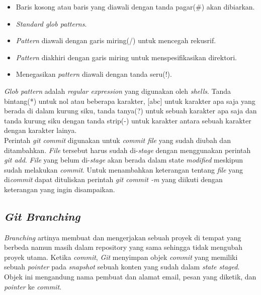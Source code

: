 \begin{itemize}
	\item Baris kosong atau baris yang diawali dengan tanda pagar(\#) akan dibiarkan.
	\item \textit{Standard glob patterns}.
	\item \textit{Pattern} diawali dengan garis miring(/) untuk mencegah rekusrif.
	\item \textit{Pattern} diakhiri dengan garis miring untuk menspesifikasikan direktori.
	\item Menegasikan \textit{pattern} diawali dengan tanda seru(!).
\end{itemize}

\textit{Glob pattern} adalah \textit{regular expression} yang digunakan oleh \textit{shells}. Tanda bintang(*) untuk nol atau beberapa karakter, [abc] untuk karakter apa saja yang berada di dalam kurung siku, tanda tanya(?) untuk sebuah karakter apa saja dan tanda kurung siku dengan tanda strip(-) untuk karakter antara sebuah karakter dengan karakter lainya.\\

Perintah \textit{git commit} digunakan untuk \textit{commit file} yang sudah diubah dan ditambahkan. \textit{File} tersebut harus sudah di-\textit{stage} dengan menggunakan perintah \textit{git add}. \textit{File} yang belum di-\textit{stage} akan berada dalam state \textit{modified} meskipun sudah melakukan \textit{commit}. Untuk menambahkan keterangan tentang \textit{file} yang di\textit{commit} dapat dituliskan perintah \textit{git commit -m} yang diikuti dengan keterangan yang ingin disampaikan. 


\subsection{\textit{Git Branching}}
\textit{Branching} artinya membuat dan mengerjakan sebuah proyek di tempat yang berbeda namun masih dalam repository yang sama sehingga tidak mengubah proyek utama. Ketika \textit{commit}, \textit{Git} menyimpan objek \textit{commit} yang memiliki sebuah \textit{pointer} pada \textit{snapshot} sebuah konten yang sudah dalam \textit{state staged}. Objek ini mengandung nama pembuat dan alamat email, pesan yang diketik, dan \textit{pointer} ke \textit{commit}. \\

